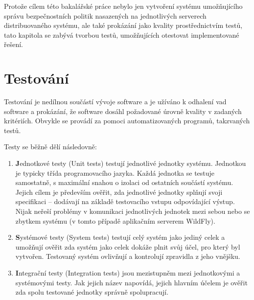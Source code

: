 Protože cílem této bakalářské práce nebylo jen vytvoření systému umožňujícího správu bezpečnostních politik nasazených na jednotlivých serverech distribuovaného systému, ale také prokázání jako kvality prostřednictvím testů, tato kapitola se zabývá tvorbou testů, umožňujících otestovat implementované řešení.

\section{Testování}

Testování je nedílnou součástí vývoje software a je užíváno k odhalení vad software a prokázání, že software dosáhl požadované úrovně kvality v zadaných kritériích. Obvykle se provádí za pomoci automatizovaných programů, takzvaných testů. \cite{ivsTest}

Testy se běžně dělí následovně: \cite{testsTypes}\cite{ivsTest}

\begin{enumerate}
  
  \item {\textbf Jednotkové testy (Unit tests)} testují jednotlivé jednotky systému. Jednotkou je typicky třída programovacího jazyka. Každá jednotka se testuje samostatně, s maximální snahou o izolaci od ostatních součástí systému. Jejich cílem je především ověřit, zda jednotlivé jednotky splňují svoji specifikaci -- dodávají na základě testovacího vstupu odpovídající výstup. Nijak neřeší problémy v komunikaci jednotlivých jednotek mezi sebou nebo se zbytkem systému (v tomto případě aplikačním serverem WildFly). \cite{testsTypes}\cite{ivsTest}
  
  \item {\textbf Systémové testy (System tests)} testují celý systém jako jediný celek a umožňují ověřit zda systém jako celek dokáže plnit svůj účel, pro který byl vytvořen. Testovaný systém ovlivňují a kontrolují zpravidla z jeho vnějšku. \cite{testsTypes}\cite{ivsTest}
  
  \item {\textbf Integrační testy (Integration tests)} jsou mezistupněm mezi jednotkovými a systémovými testy. Jak jejich název napovídá, jejich hlavním účelem je ověřit zda spolu testované jednotky správně spolupracují. \cite{testsTypes}\cite{ivsTest}
  
\end{enumerate}


